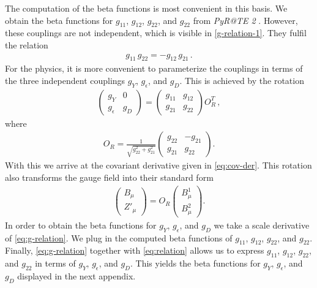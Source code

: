 \documentclass[aps,prd,twocolumn,preprintnumbers,superscriptaddress,nobibnotes,floatfix,longbibliography]{revtex4-1}
\begin{document}
The computation of the beta functions is most convenient in this basis.
We obtain the beta functions for $g_{11}$, $g_{12}$, $g_{22}$, and $g_{22}$ from \textit{PyR@TE 2} \cite{Lyonnet:2013dna,Lyonnet:2016xiz}.
However, these couplings are not independent, which is visible in \eqref{g-relation-1}.
They fulfil the relation
\begin{align}
\label{eq:relation}
g_{11} \, g_{22} = - g_{12} \, g_{21} \,.
\end{align}
For the physics, it is more convenient to parameterize the couplings in terms of the three independent couplings $g_Y$, $g_\epsilon$, and $g_D$.
This is achieved by the rotation
\begin{align}
\label{eq:g-relation}
\begin{pmatrix}
g_Y & 0 \\
g_\epsilon & g_D
\end{pmatrix}
=
\begin{pmatrix}
g_{11} & g_{12} \\
g_{21} & g_{22}
\end{pmatrix} O_R^T \,,
\end{align}
where
\begin{align}
O_R=
\frac{1}{\sqrt{g_{22}^2+g_{21}^2}}
\begin{pmatrix}
g_{22} & -g_{21} \\
g_{21} & g_{22}
\end{pmatrix}.
\end{align}
With this we arrive at the covariant derivative given in \eqref{eq:cov-der}.
This rotation also transforms the gauge field into their standard form
\begin{align}
\begin{pmatrix} B_\mu \\ Z'_\mu \end{pmatrix}
 = O_R \begin{pmatrix} B_\mu^1 \\ B_\mu^2 \end{pmatrix}.
\end{align}
In order to obtain the beta functions for $g_Y$, $g_\epsilon$, and $g_D$
we take a scale derivative of \eqref{eq:g-relation}.
We plug in the computed beta functions of $g_{11}$, $g_{12}$, $g_{22}$, and $g_{22}$.
Finally, \eqref{eq:g-relation} together with \eqref{eq:relation} allows us to express $g_{11}$, $g_{12}$, $g_{22}$, and $g_{22}$
in terms of $g_Y$, $g_\epsilon$, and $g_D$.
This yields the beta functions for $g_Y$, $g_\epsilon$, and $g_D$ displayed in the next appendix.
\end{document}

